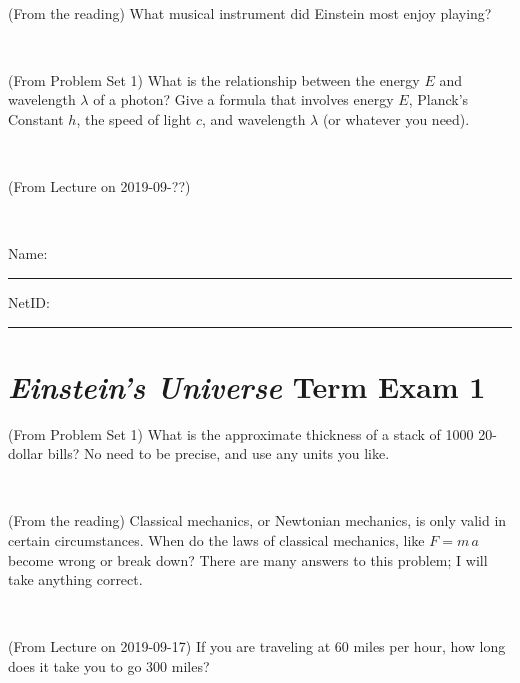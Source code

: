 \documentclass[12pt, letterpaper]{article}
\begin{document}
\vfill ~

\begin{problem} (From the reading)
What musical instrument did Einstein most enjoy playing?
\end{problem}


\vfill ~

\begin{problem} (From Problem Set 1)
What is the relationship between the energy $E$ and wavelength
$\lambda$ of a photon? Give a formula that involves energy $E$,
Planck's Constant $h$, the speed of light $c$, and wavelength
$\lambda$ (or whatever you need).
\end{problem}

\vfill ~

\begin{problem} (From Lecture on 2019-09-??)
\end{problem}


\vfill ~


\cleardoublepage



\noindent
Name: \rule[-1ex]{0.60\textwidth}{0.1pt}
NetID: \rule[-1ex]{0.20\textwidth}{0.1pt}

\section*{\textsl{Einstein's Universe} Term Exam 1}
\setcounter{problem}{1}


\begin{problem} (From Problem Set 1)
What is the approximate thickness of a stack of 1000 20-dollar bills?
No need to be precise, and use any units you like.
\end{problem}


\vfill ~

\begin{problem} (From the reading)
Classical mechanics, or Newtonian mechanics, is only valid in certain
circumstances. When do the laws of classical mechanics, like $F =
m\,a$ become wrong or break down? There are many answers to this
problem; I will take anything correct.
\end{problem}


\vfill ~

\begin{problem} (From Lecture on 2019-09-17)
If you are traveling at 60 miles per hour, how long does
it take you to go 300 miles?
\end{problem}


\vfill ~
\end{document}
